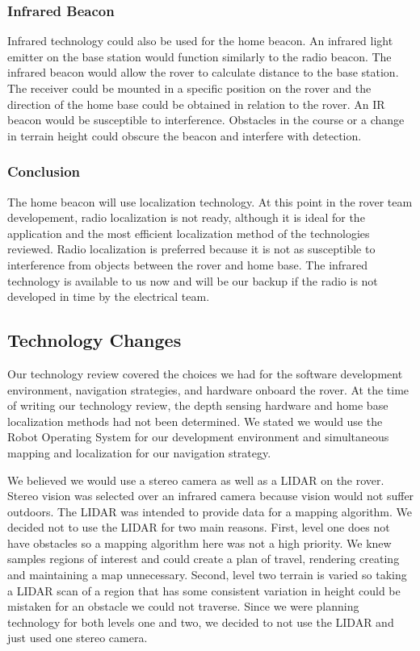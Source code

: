 \documentclass[10pt, oneside,onecolumn]{IEEEtran}
\begin{document}
\begin{titlepage}
\subsubsection{Infrared Beacon}

	Infrared technology could also be used for the home beacon. An infrared light emitter on the base station would function similarly to the radio beacon. The infrared beacon would allow the rover to calculate distance to the base station. The receiver could be mounted in a specific position on the rover and the direction of the home base could be obtained in relation to the rover. An IR beacon would be susceptible to interference. Obstacles in the course or a change in terrain height could obscure the beacon and interfere with detection. 

\subsubsection{Conclusion}

	The home beacon will use localization technology. At this point in the rover team developement, radio localization is not ready, although it is ideal for the application and the most efficient localization method of the technologies reviewed. Radio localization is preferred because it is not as susceptible to interference from objects between the rover and home base. The infrared technology is available to us now and will be our backup if the radio is not developed in time by the electrical team. 

\subsection{Technology Changes}

Our technology review covered the choices we had for the software development environment, navigation strategies, and hardware onboard the rover. At the time of writing our technology review, the depth sensing hardware and home base localization methods had not been determined. We stated we would use the Robot Operating System for our development environment and simultaneous mapping and localization for our navigation strategy.

We believed we would use a stereo camera as well as a LIDAR on the rover. Stereo vision was selected over an infrared camera because vision would not suffer outdoors. The LIDAR was intended to provide data for a mapping algorithm. We decided not to use the LIDAR for two main reasons. First, level one does not have obstacles so a mapping algorithm here was not a high priority. We knew samples regions of interest and could create a plan of travel, rendering creating and maintaining a map unnecessary. Second, level two terrain is varied so taking a LIDAR scan of a region that has some consistent variation in height could be mistaken for an obstacle we could not traverse. Since we were planning technology for both levels one and two, we decided to not use the LIDAR and just used one stereo camera.


\end{titlepage}
\end{document}
